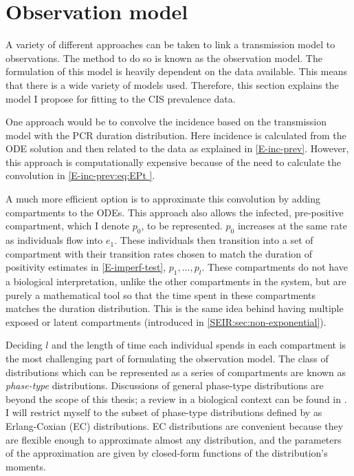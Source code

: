 \documentclass[thesis.tex]{subfiles}
\begin{document}
\section{Observation model} \label{SEIR:sec:observation}

A variety of different approaches can be taken to link a transmission model to observations.
The method to do so is known as the observation model.
The formulation of this model is heavily dependent on the data available.
This means that there is a wide variety of models used.
Therefore, this section  explains the model I propose for fitting to the CIS prevalence data.

One approach would be to convolve the incidence based on the transmission model with the PCR duration distribution.
Here incidence is calculated from the ODE solution and then related to the data as explained in \cref{E-inc-prev}.
However, this approach is computationally expensive because of the need to calculate the convolution in \cref{E-inc-prev:eq:EPt }.

A much more efficient option is to approximate this convolution by adding compartments to the ODEs.
This approach also allows the infected, pre-positive compartment, which I denote $p_0$, to be represented.
$p_0$ increases at the same rate as individuals flow into $e_1$.
These individuals then transition into a set of compartment with their transition rates chosen to match the duration of positivity estimates in \cref{E-imperf-test}, $p_1, \dots, p_l$.
These compartments do not have a biological interpretation, unlike the other compartments in the system, but are purely a mathematical tool so that the time spent in these compartments matches the duration distribution.
This is the same idea behind having multiple exposed or latent compartments (introduced in \cref{SEIR:sec:non-exponential}).

Deciding $l$ and the length of time each individual spends in each compartment is the most challenging part of formulating the observation model.
The class of distributions which can be represented as a series of compartments are known as \emph{phase-type} distributions.
Discussions of general phase-type distributions are beyond the scope of this thesis; a review in a biological context can be found in \textcite{hobolthPhasetype}.
I will restrict myself to the subset of phase-type distributions defined by \textcite{osogamiClosed} as Erlang-Coxian (EC) distributions.
EC distributions are convenient because they are flexible enough to approximate almost any distribution, and the parameters of the approximation are given by closed-form functions of the distribution's moments.
\end{document}
